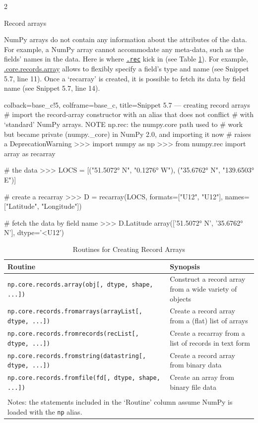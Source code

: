 \documentclass[a4paper,11pt]{book}
\newcommand{\question}[1]{%
    \begin{tcolorbox}[colback=comp_c!10,colframe=comp_c,sidebyside align=top,width=\linewidth,before skip=1ex]
        #1
    \end{tcolorbox}
    \switchcolumn%
}
\newcommand{\note}[1]{%
    \begin{tcolorbox}[colback=white!0,colframe=white!10,width=\linewidth,before skip=1ex]
        #1
    \end{tcolorbox}
}
\begin{document}
\begin{paracol}{2}
	\question{\raggedright Record arrays}
	\note{NumPy arrays do not contain any information about the attributes of the data. For example, a NumPy array cannot accommodate any meta-data, such as the fields' names in the data. Here is where \href{https://numpy.org/doc/stable/reference/routines.array-creation.html}{\texttt{.rec}} kick in (see Table \ref{tab:array_for_record_arrays}). For example, \href{https://numpy.org/doc/stable/reference/generated/numpy.core.records.array.html\#numpy.core.records.array}{.core.records.array} allows to flexibly specify a field's type and name (see Snippet 5.7, line 11). Once a `recarray' is created, it is possible to fetch its data by field name (see Snippet 5.7, line 14).}
\end{paracol}

\begin{pythoncode}[linenos=true,]{colback=base_c!5, colframe=base_c, title=\sffamily Snippet 5.7 --- creating record arrays}
# import the record-array constructor with an alias that does not conflict
# with `standard' NumPy arrays. NOTE np.rec: the numpy.core path used to
# work but became private (numpy._core) in NumPy 2.0, and importing it now
# raises a DeprecationWarning
>>> import numpy as np
>>> from numpy.rec import array as recarray

# the data
>>> LOCS = [("51.5072° N", "0.1276° W"), ("35.6762° N", "139.6503° E")]

# create a recarray
>>> D = recarray(LOCS, formats=["U12", "U12"], names=["Latitude", "Longitude"])

# fetch the data by field name
>>> D.Latitude
array(['51.5072° N', '35.6762° N'], dtype='<U12')
\end{pythoncode}

\begin{table}
	\centering
	\caption{Routines for Creating Record Arrays}
	\label{tab:array_for_record_arrays}
	\begin{tabular}{lp{12cm}}
		\toprule \toprule
			Routine & Synopsis \\
			\midrule
			\texttt{np.core.records.array(obj[, dtype, shape, ...])} &
			Construct a record array from a wide variety of objects\\
			\texttt{np.core.records.fromarrays(arrayList[, dtype, ...])} &
			Create a record array from a (flat) list of arrays\\
			\texttt{np.core.records.fromrecords(recList[, dtype, ...])} &
			Create a recarray from a list of records in text form\\
			\texttt{np.core.records.fromstring(datastring[, dtype, ...])} &
			Create a record array from binary data\\
			\texttt{np.core.records.fromfile(fd[, dtype, shape, ...])} &
			Create an array from binary file data\\
			\bottomrule \\[-1.8ex]
		    \multicolumn{2}{l}{Notes: the statements included in the `Routine' column assume NumPy is loaded with the \texttt{np} alias.} \\
	\end{tabular}
\end{table}
\clearpage
\end{document}
